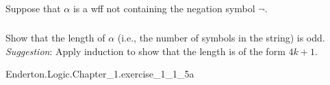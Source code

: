 \documentclass{report}
\begin{document}
\subsection{}%

  Suppose that $\alpha$ is a wff not containing the negation symbol $\neg$.

\subsubsection{}%

  Show that the length of $\alpha$ (i.e., the number of symbols in the string)
    is odd.
  \textit{Suggestion}: Apply induction to show that the length is of the form
    $4k + 1$.

    {Enderton.Logic.Chapter\_1.exercise\_1\_1\_5a}
\end{document}
